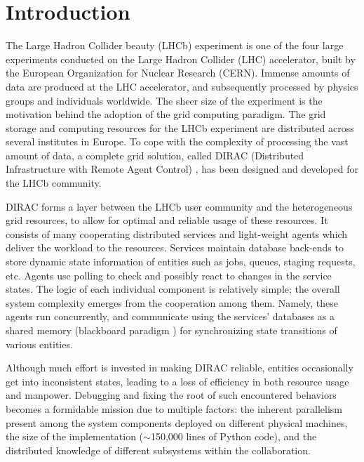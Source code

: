 \documentclass[sort&compress,preprint,3p]{elsarticle}
\begin{document}
\section{Introduction}

The Large Hadron Collider beauty (LHCb) experiment \cite{LHCb} is one of the
four large
experiments conducted on the Large Hadron Collider (LHC) accelerator, built by
the European Organization for Nuclear Research (CERN). Immense amounts of data
are produced at the LHC accelerator, and subsequently processed by physics
groups and individuals worldwide. The sheer size of the experiment is the
motivation behind the adoption of the grid computing paradigm. The grid storage
and computing resources for the LHCb experiment are distributed across several
institutes in Europe. To cope with the complexity of processing the vast amount
of data, a complete grid solution, called DIRAC (Distributed Infrastructure with
Remote Agent Control) \cite{DIRAC_CommGridSolution,DIRAC_ReliableDataMaangement}, 
has been designed and developed for the
LHCb
community.

DIRAC forms a layer between the LHCb user community and the heterogeneous
grid resources, to allow for optimal and reliable usage of these
resources. It consists of many cooperating distributed services and light-weight
agents which deliver the workload to the resources. 
Services maintain database back-ends to store
dynamic state information of entities such as jobs, queues, staging requests, etc. Agents use polling to check
and possibly react to changes in the service states.
The logic of each individual
component is relatively simple; the overall system complexity emerges from the
cooperation among them. Namely, these agents run concurrently, and communicate
using the services' databases as a shared memory (blackboard paradigm \cite{IEEEexample:blackboard_systems}) for
synchronizing state transitions of various entities.

Although much effort is invested in making DIRAC reliable, entities occasionally
get into inconsistent states, leading to a loss of efficiency in both
resource usage and manpower. Debugging and fixing the root of such encountered
behaviors becomes a formidable mission due to multiple factors: the inherent
parallelism present among the system components deployed on different physical
machines, the size of the implementation ($\sim$150,000 lines of Python code),
and the distributed knowledge of different subsystems within the collaboration.
\end{document}
